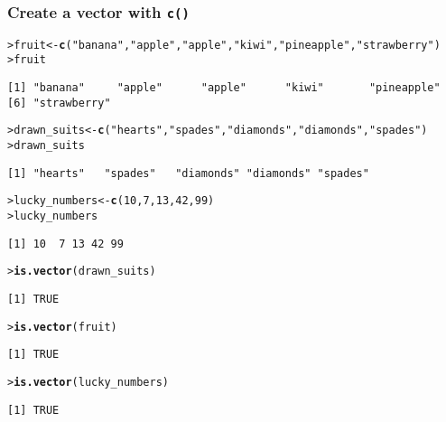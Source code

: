 \documentclass[13pt,aspectratio=169]{beamer}\usepackage[]{graphicx}\usepackage[]{color}
\makeatletter
\newcommand{\hlnum}[1]{\textcolor[rgb]{0.686,0.059,0.569}{#1}}%
\newcommand{\hlstr}[1]{\textcolor[rgb]{0.192,0.494,0.8}{#1}}%
\newcommand{\hlstd}[1]{\textcolor[rgb]{0.345,0.345,0.345}{#1}}%
\newcommand{\hlkwb}[1]{\textcolor[rgb]{0.69,0.353,0.396}{#1}}%
\newcommand{\hlkwd}[1]{\textcolor[rgb]{0.737,0.353,0.396}{\textbf{#1}}}%
\newenvironment{kframe}{%
 \def\at@end@of@kframe{}%
 \ifinner\ifhmode%
  \def\at@end@of@kframe{\end{minipage}}%
  \begin{minipage}{\columnwidth}%
 \fi\fi%
 \def\FrameCommand##1{\hskip\@totalleftmargin \hskip-\fboxsep
 \colorbox{shadecolor}{##1}\hskip-\fboxsep
     \hskip-\linewidth \hskip-\@totalleftmargin \hskip\columnwidth}%
 \MakeFramed {\advance\hsize-\width
   \@totalleftmargin\z@ \linewidth\hsize
   \@setminipage}}%
 {\par\unskip\endMakeFramed%
 \at@end@of@kframe}
\newenvironment{knitrout}{}{} %
\renewcommand{\tt}[1]{\texttt{#1}}
\renewenvironment{knitrout}{\setlength{\topsep}{0mm}}{}
\makeatother
\begin{document}
\begin{frame}[fragile]
    \frametitle{Create a vector with \tt{c()}}
\begin{knitrout}\small
{}\color{fgcolor}\begin{kframe}
\begin{alltt}
\hlstd{> }\hlstd{fruit} \hlkwb{<-} \hlkwd{c}\hlstd{(}\hlstr{"banana"}\hlstd{,} \hlstr{"apple"}\hlstd{,} \hlstr{"apple"}\hlstd{,} \hlstr{"kiwi"}\hlstd{,} \hlstr{"pineapple"}\hlstd{,} \hlstr{"strawberry"}\hlstd{)}
\hlstd{> }\hlstd{fruit}
\end{alltt}
\begin{verbatim}
[1] "banana"     "apple"      "apple"      "kiwi"       "pineapple" 
[6] "strawberry"
\end{verbatim}
\begin{alltt}
\hlstd{> }\hlstd{drawn_suits} \hlkwb{<-} \hlkwd{c}\hlstd{(}\hlstr{"hearts"}\hlstd{,} \hlstr{"spades"}\hlstd{,} \hlstr{"diamonds"}\hlstd{,} \hlstr{"diamonds"}\hlstd{,} \hlstr{"spades"}\hlstd{)}
\hlstd{> }\hlstd{drawn_suits}
\end{alltt}
\begin{verbatim}
[1] "hearts"   "spades"   "diamonds" "diamonds" "spades"  
\end{verbatim}
\begin{alltt}
\hlstd{> }\hlstd{lucky_numbers} \hlkwb{<-} \hlkwd{c}\hlstd{(}\hlnum{10}\hlstd{,} \hlnum{7}\hlstd{,} \hlnum{13}\hlstd{,} \hlnum{42}\hlstd{,} \hlnum{99}\hlstd{)}
\hlstd{> }\hlstd{lucky_numbers}
\end{alltt}
\begin{verbatim}
[1] 10  7 13 42 99
\end{verbatim}
\begin{alltt}
\hlstd{> }\hlkwd{is.vector}\hlstd{(drawn_suits)}
\end{alltt}
\begin{verbatim}
[1] TRUE
\end{verbatim}
\begin{alltt}
\hlstd{> }\hlkwd{is.vector}\hlstd{(fruit)}
\end{alltt}
\begin{verbatim}
[1] TRUE
\end{verbatim}
\begin{alltt}
\hlstd{> }\hlkwd{is.vector}\hlstd{(lucky_numbers)}
\end{alltt}
\begin{verbatim}
[1] TRUE
\end{verbatim}
\end{kframe}
\end{knitrout}
\end{frame}
\end{document}
